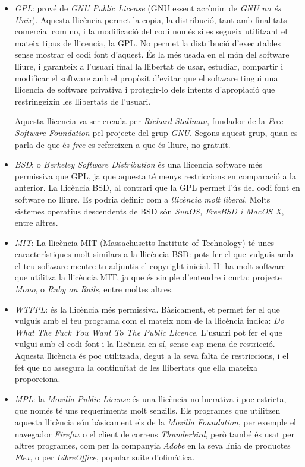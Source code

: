 \begin{itemize}
	\item \emph{GPL}: prové de \emph{GNU Public License} (GNU essent acrònim de
	\emph{GNU no és Unix}). Aquesta 
	llicència permet la copia, la distribució, tant amb finalitats comercial com no, i 
	la modificació del codi només si es segueix utilitzant el mateix 
	tipus de llicencia, la GPL. No permet la distribució d'executables sense mostrar 
	el codi font d'aquest. És la més usada en el món del 
	software lliure, i garanteix a l'usuari final la llibertat de usar, estudiar, compartir 
	i modificar el software amb el propòsit d'evitar que el software tingui una 
	llicencia de software privativa i protegir-lo dels intents d'apropiació que 
	restringeixin les llibertats de l'usuari.
	
	Aquesta llicencia va ser creada per
	\emph{Richard Stallman}, fundador de la \emph{Free Software Foundation}
	pel projecte del grup \emph{GNU}.
	Segons aquest grup, quan es parla de que és \textit{free} es refereixen a que és 
	lliure, no gratuït. \cite {gnugpl} \cite {tldr}
	\item \emph{BSD}: o \emph{Berkeley Software Distribution} és una llicencia software més 
	permissiva que GPL, ja que aquesta té menys restriccions en comparació a la 
	anterior. La llicència BSD, al contrari 
	que la GPL permet l'ús del codi font en software no lliure. Es podria definir com a \emph{llicència molt liberal}. Molts sistemes operatius descendents de BSD són \emph{SunOS, 
	FreeBSD i MacOS X}, entre altres. \cite {bsd} \cite {tldr}
	\item \emph{MIT}: La llicència MIT (Massachusetts Institute of Technology)
	té unes característiques molt similars a la llicència BSD:
	pots fer el que vulguis amb el teu software mentre tu adjuntis el copyright 
	inicial. Hi ha molt software que utilitza la llicència MIT, ja que és simple d'entendre i curta; projecte \emph{Mono}, o \emph{Ruby on Rails}, entre moltes altres.\cite {mit} \cite {tldr}
	\item \emph{WTFPL}: és la llicència més permissiva. Bàsicament, et permet fer
	el que vulguis amb el teu programa com el mateix nom de la llicència indica:
	\emph{Do What The Fuck You Want To The Public Licence}.
	L'usuari pot fer el que vulgui amb el codi font i la llicència en sí, sense
	cap mena de restricció. Aquesta llicència és poc utilitzada, degut a la seva
	falta de restriccions, i el fet que no assegura la continuïtat de les llibertats
	que ella mateixa proporciona.\cite {tldr}
	\item \emph{MPL}: la \emph{Mozilla Public License} és una llicència no lucrativa i poc estricta, que només té uns requeriments molt senzills.
	Els programes que utilitzen aquesta llicència són bàsicament els de la \emph{Mozilla Foundation},
	per exemple el navegador \emph{Firefox} o el client de correus \emph{Thunderbird},
	però també és usat per altres programes, com per la companyia \emph{Adobe} en
	la seva línia de productes \emph{Flex}, o per \emph{LibreOffice}, popular suite
	d'ofimàtica. \cite {tldr}
	

\end{itemize}
